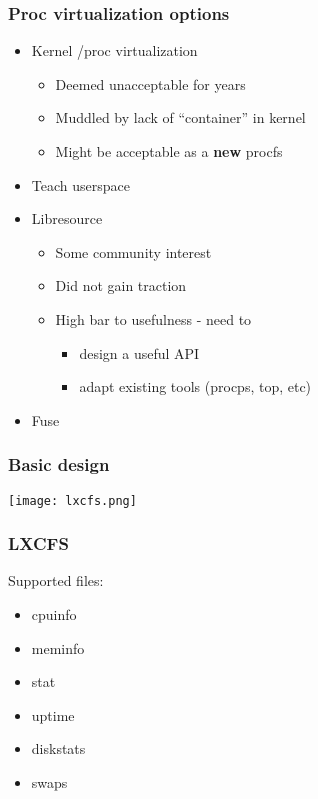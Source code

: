 \documentclass{beamer}
\begin{document}
\begin{frame}
\frametitle{Proc virtualization options}
\begin{itemize}
\item Kernel /proc virtualization
	\begin{itemize}
	\item Deemed unacceptable for years
	\item Muddled by lack of ``container'' in kernel
	\item Might be acceptable as a {\bf new} procfs
	\end{itemize}
\item Teach userspace
\item Libresource
	\begin{itemize}
	\item Some community interest
	\item Did not gain traction
	\item High bar to usefulness - need to
		\begin{itemize}
		\item design a useful API
		\item adapt existing tools (procps, top, etc)
		\end{itemize}
	\end{itemize}
\item Fuse
\end{itemize}
\end{frame}

\begin{frame}
\frametitle{Basic design}
\texttt{[image: lxcfs.png]}
\end{frame}

\begin{frame}
\frametitle{LXCFS}
Supported files:
	\begin{itemize}
	\item cpuinfo
	\item meminfo
	\item stat
	\item uptime
	\item diskstats
	\item swaps
	\end{itemize}
\end{frame}
\end{document}
